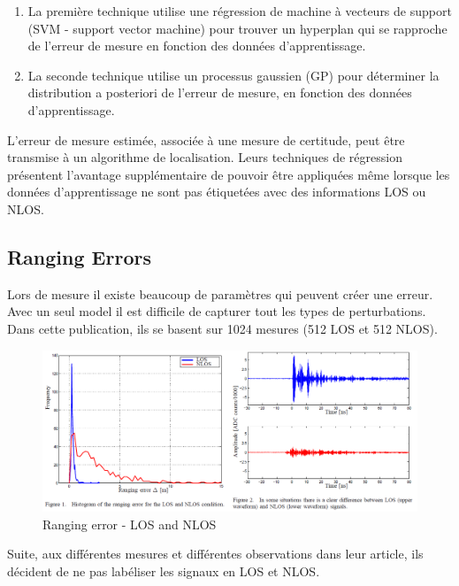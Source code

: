 \begin{enumerate}
	\item La première technique utilise une régression de machine à vecteurs de support (SVM - support vector machine) pour trouver un hyperplan qui se rapproche de l'erreur de mesure en fonction des données d'apprentissage. 
	\item La seconde technique utilise un processus gaussien (GP) pour déterminer la distribution a posteriori de l'erreur de mesure, en fonction des données d'apprentissage. 
\end{enumerate}

L'erreur de mesure estimée, associée à une mesure de certitude, peut être transmise à un algorithme de localisation. Leurs techniques de régression présentent l'avantage supplémentaire de pouvoir être appliquées même lorsque les données d'apprentissage ne sont pas étiquetées avec des informations LOS ou NLOS.

\subsection{Ranging Errors}
Lors de mesure il existe beaucoup de paramètres qui peuvent créer une erreur. Avec un seul model il est difficile de capturer tout les types de perturbations. Dans cette publication, ils se basent sur 1024 mesures (512 LOS et 512 NLOS).

\begin{figure}[H]
	\begin{center}
		\includegraphics[scale=1]{figures/LosNlos.png}
		\caption{Ranging error - LOS and NLOS}
		\label{fig:LosNlos} %
	\end{center}
\end{figure}

Suite, aux différentes mesures et différentes observations dans leur article, ils décident de ne pas labéliser les signaux en LOS et NLOS.

